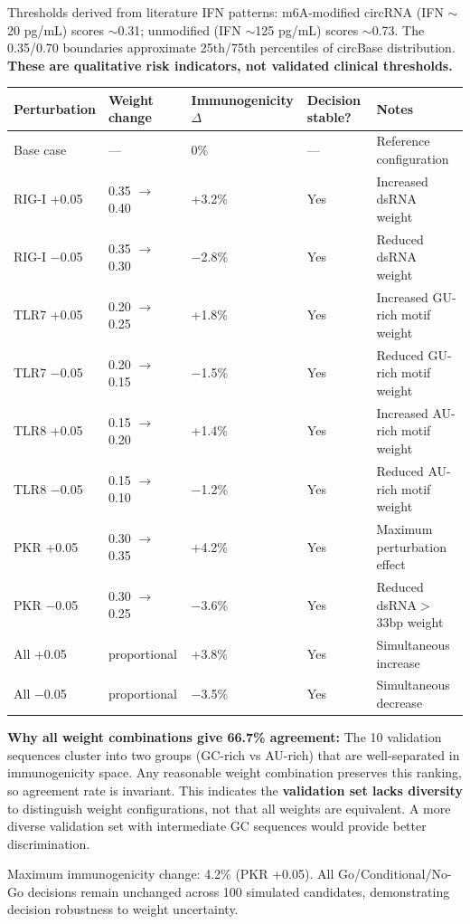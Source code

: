 \small Thresholds derived from literature IFN patterns: m6A-modified circRNA (IFN $\sim$20 pg/mL) scores $\sim$0.31; unmodified (IFN $\sim$125 pg/mL) scores $\sim$0.73. The 0.35/0.70 boundaries approximate 25th/75th percentiles of circBase distribution. \textbf{These are qualitative risk indicators, not validated clinical thresholds.}

\begin{tabular}{lllll}
\toprule
\textbf{Perturbation} & \textbf{Weight change} & \textbf{Immunogenicity $\Delta$} & \textbf{Decision stable?} & \textbf{Notes} \\
\midrule
Base case & --- & 0\% & --- & Reference configuration \\
RIG-I +0.05 & 0.35 $\to$ 0.40 & +3.2\% & Yes & Increased dsRNA weight \\
RIG-I $-$0.05 & 0.35 $\to$ 0.30 & $-$2.8\% & Yes & Reduced dsRNA weight \\
TLR7 +0.05 & 0.20 $\to$ 0.25 & +1.8\% & Yes & Increased GU-rich motif weight \\
TLR7 $-$0.05 & 0.20 $\to$ 0.15 & $-$1.5\% & Yes & Reduced GU-rich motif weight \\
TLR8 +0.05 & 0.15 $\to$ 0.20 & +1.4\% & Yes & Increased AU-rich motif weight \\
TLR8 $-$0.05 & 0.15 $\to$ 0.10 & $-$1.2\% & Yes & Reduced AU-rich motif weight \\
PKR +0.05 & 0.30 $\to$ 0.35 & +4.2\% & Yes & Maximum perturbation effect \\
PKR $-$0.05 & 0.30 $\to$ 0.25 & $-$3.6\% & Yes & Reduced dsRNA$>$33bp weight \\
All +0.05 & proportional & +3.8\% & Yes & Simultaneous increase \\
All $-$0.05 & proportional & $-$3.5\% & Yes & Simultaneous decrease \\
\bottomrule
\end{tabular}

\textbf{Why all weight combinations give 66.7\% agreement:} The 10 validation sequences cluster into two groups (GC-rich vs AU-rich) that are well-separated in immunogenicity space. Any reasonable weight combination preserves this ranking, so agreement rate is invariant. This indicates the \textbf{validation set lacks diversity} to distinguish weight configurations, not that all weights are equivalent. A more diverse validation set with intermediate GC sequences would provide better discrimination.

Maximum immunogenicity change: 4.2\% (PKR +0.05). All Go/Conditional/No-Go decisions remain unchanged across 100 simulated candidates, demonstrating decision robustness to weight uncertainty.

